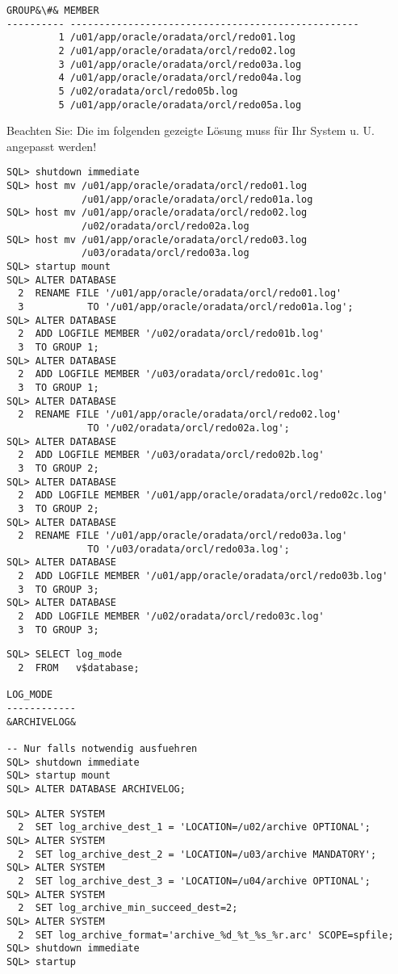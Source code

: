 \begin{enumerate}
\begin{lstlisting}[language=oracle_sql,alsolanguage=sqlplus]
    GROUP&\#& MEMBER
---------- --------------------------------------------------
         1 /u01/app/oracle/oradata/orcl/redo01.log
         2 /u01/app/oracle/oradata/orcl/redo02.log
         3 /u01/app/oracle/oradata/orcl/redo03a.log
         4 /u01/app/oracle/oradata/orcl/redo04a.log
         5 /u02/oradata/orcl/redo05b.log
         5 /u01/app/oracle/oradata/orcl/redo05a.log
        \end{lstlisting}
\clearpage
      
        Beachten Sie: Die im folgenden gezeigte Lösung muss für Ihr System u. U. angepasst werden!
        \begin{lstlisting}[language=oracle_sql,alsolanguage=sqlplus]
SQL> shutdown immediate
SQL> host mv /u01/app/oracle/oradata/orcl/redo01.log
             /u01/app/oracle/oradata/orcl/redo01a.log
SQL> host mv /u01/app/oracle/oradata/orcl/redo02.log
             /u02/oradata/orcl/redo02a.log
SQL> host mv /u01/app/oracle/oradata/orcl/redo03.log
             /u03/oradata/orcl/redo03a.log
SQL> startup mount
SQL> ALTER DATABASE
  2  RENAME FILE '/u01/app/oracle/oradata/orcl/redo01.log'
  3           TO '/u01/app/oracle/oradata/orcl/redo01a.log';
SQL> ALTER DATABASE
  2  ADD LOGFILE MEMBER '/u02/oradata/orcl/redo01b.log'
  3  TO GROUP 1;
SQL> ALTER DATABASE
  2  ADD LOGFILE MEMBER '/u03/oradata/orcl/redo01c.log'
  3  TO GROUP 1;
SQL> ALTER DATABASE
  2  RENAME FILE '/u01/app/oracle/oradata/orcl/redo02.log'
              TO '/u02/oradata/orcl/redo02a.log';
SQL> ALTER DATABASE
  2  ADD LOGFILE MEMBER '/u03/oradata/orcl/redo02b.log'
  3  TO GROUP 2;
SQL> ALTER DATABASE
  2  ADD LOGFILE MEMBER '/u01/app/oracle/oradata/orcl/redo02c.log'
  3  TO GROUP 2;
SQL> ALTER DATABASE
  2  RENAME FILE '/u01/app/oracle/oradata/orcl/redo03a.log'
              TO '/u03/oradata/orcl/redo03a.log';
SQL> ALTER DATABASE
  2  ADD LOGFILE MEMBER '/u01/app/oracle/oradata/orcl/redo03b.log'
  3  TO GROUP 3;
SQL> ALTER DATABASE
  2  ADD LOGFILE MEMBER '/u02/oradata/orcl/redo03c.log'
  3  TO GROUP 3;
        \end{lstlisting}
\clearpage
      
        \begin{lstlisting}[language=oracle_sql,alsolanguage=sqlplus]
SQL> SELECT log_mode
  2  FROM   v$database;

LOG_MODE
------------
&ARCHIVELOG&

-- Nur falls notwendig ausfuehren
SQL> shutdown immediate
SQL> startup mount
SQL> ALTER DATABASE ARCHIVELOG;
        \end{lstlisting}
      
        \begin{lstlisting}[language=oracle_sql,alsolanguage=sqlplus]
SQL> ALTER SYSTEM
  2  SET log_archive_dest_1 = 'LOCATION=/u02/archive OPTIONAL';
SQL> ALTER SYSTEM
  2  SET log_archive_dest_2 = 'LOCATION=/u03/archive MANDATORY';
SQL> ALTER SYSTEM
  2  SET log_archive_dest_3 = 'LOCATION=/u04/archive OPTIONAL';
SQL> ALTER SYSTEM
  2  SET log_archive_min_succeed_dest=2;
SQL> ALTER SYSTEM
  2  SET log_archive_format='archive_%d_%t_%s_%r.arc' SCOPE=spfile;
SQL> shutdown immediate
SQL> startup
        \end{lstlisting}
    \end{enumerate}
\clearpage
